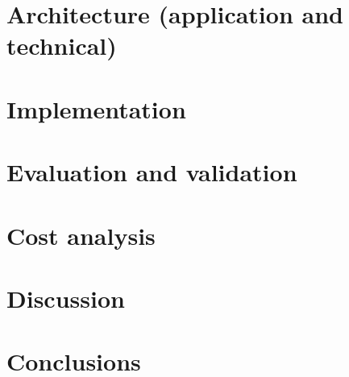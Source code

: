 \documentclass{article}
\begin{document}
\section{Architecture (application and technical)}
\label{sec:arch}

\section{Implementation}
\label{sec:impl}

\section{Evaluation and validation}
\label{sec:eval}

\section{Cost analysis}
\label{sec:cost}

\section{Discussion}
\label{sec:disc}

\section{Conclusions}
\label{sec:conc}
\end{document}
